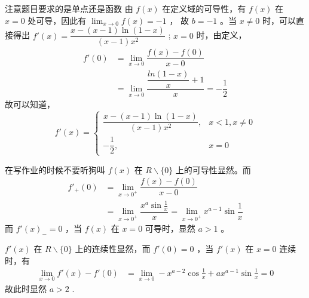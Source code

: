 \begin{answer}[660T27]{注意题目要求的是单点还是函数}
    由 $ f(x) $ 在定义域的可导性，有 $ f(x) $ 在 $ x=0 $ 处可导，因此有 $ {\displaystyle\lim_{x\rightarrow 0}}f(x) = -1 $ ，
    故 $ b = -1 $ 。当 $ x \not=0 $ 时，可以直接得出 $ f'(x) = \dfrac{x-(x-1)\ln(1-x)}{(x-1)x^2} $ ;
    $ x=0 $ 时，由定义，\begin{equation*}
        \begin{aligned}
            f'(0) &= {\displaystyle\lim_{x\rightarrow 0}}\dfrac{f(x) - f(0)}{x - 0} \\&=
            {\displaystyle\lim_{x\rightarrow 0}}\dfrac{\dfrac{ln(1-x)}{x} + 1}{x} = -\dfrac{1}{2}
        \end{aligned}
    \end{equation*}
    故可以知道，
    $$
        f'(x) = \begin{cases}
            \dfrac{x-(x-1)\ln(1-x)}{(x-1)x^2},& x < 1, x \neq 0\\ 
            -\dfrac{1}{2},& x = 0
        \end{cases}
    $$ 
\end{answer}


\begin{answer}[660T28]{在写作业的时候不要听狗叫}
    $ f(x) $ 在 $ R \backslash \{0\} $ 上的可导性显然。而 \begin{equation*}
        \begin{aligned}
            f'_+(0) &= {\displaystyle\lim_{x\rightarrow 0^+}}\dfrac{f(x) - f(0)}{x - 0} \\&=
            {\displaystyle\lim_{x\rightarrow 0^+}}\dfrac{x^a\sin \frac{1}{x}}{x} = {\displaystyle\lim_{x\rightarrow 0^+}}
            x^{a-1}\sin \dfrac{1}{x}
        \end{aligned}
    \end{equation*}
    而 $ f'(x)_- = 0 $ ，当 $ f(x) $ 在 $ x = 0 $ 可导时，显然 $ a > 1 $ 。

    $ f'(x) $ 在 $ R\backslash \{0\} $ 上的连续性显然，而 $ f'(0) = 0 $ ，当 $ f'(x) $ 在 $ x = 0 $ 连续时，有 \begin{equation*}
        \begin{aligned}
            {\displaystyle\lim_{x\rightarrow 0}}f'(x) - f'(0) &= {\displaystyle\lim_{x\rightarrow 0}}
            -x^{a-2}\cos \frac{1}{x} + ax^{a-1}\sin \frac{1}{x} = 0
        \end{aligned}
    \end{equation*}
    故此时显然 $ a > 2 $ .
\end{answer}

